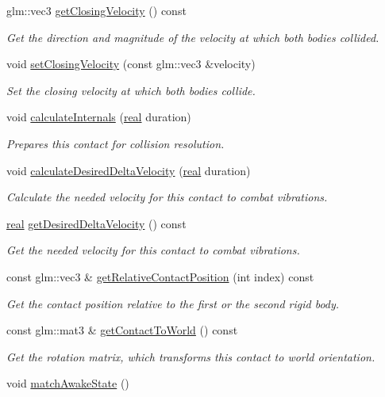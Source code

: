 \begin{DoxyCompactItemize}
glm\+::vec3 \mbox{\hyperlink{classr3_1_1_contact_a4c02edbc7514fbc84cd1b7d70797619c}{get\+Closing\+Velocity}} () const
\begin{DoxyCompactList}\small\item\em Get the direction and magnitude of the velocity at which both bodies collided. \end{DoxyCompactList}\item 
void \mbox{\hyperlink{classr3_1_1_contact_a7b837cd82d64d93ce1a98cdd172dd868}{set\+Closing\+Velocity}} (const glm\+::vec3 \&velocity)
\begin{DoxyCompactList}\small\item\em Set the closing velocity at which both bodies collide. \end{DoxyCompactList}\item 
void \mbox{\hyperlink{classr3_1_1_contact_a4e00a32cb21ff4fc8ec826f163bcddae}{calculate\+Internals}} (\mbox{\hyperlink{namespacer3_ab2016b3e3f743fb735afce242f0dc1eb}{real}} duration)
\begin{DoxyCompactList}\small\item\em Prepares this contact for collision resolution. \end{DoxyCompactList}\item 
void \mbox{\hyperlink{classr3_1_1_contact_a3f2c146006389bf6273cdd078763b7a3}{calculate\+Desired\+Delta\+Velocity}} (\mbox{\hyperlink{namespacer3_ab2016b3e3f743fb735afce242f0dc1eb}{real}} duration)
\begin{DoxyCompactList}\small\item\em Calculate the needed velocity for this contact to combat vibrations. \end{DoxyCompactList}\item 
\mbox{\hyperlink{namespacer3_ab2016b3e3f743fb735afce242f0dc1eb}{real}} \mbox{\hyperlink{classr3_1_1_contact_aff234679aa4302b69b8dd101eb969705}{get\+Desired\+Delta\+Velocity}} () const
\begin{DoxyCompactList}\small\item\em Get the needed velocity for this contact to combat vibrations. \end{DoxyCompactList}\item 
const glm\+::vec3 \& \mbox{\hyperlink{classr3_1_1_contact_ade5794f7055fb30ff52f9193b92c6bf0}{get\+Relative\+Contact\+Position}} (int index) const
\begin{DoxyCompactList}\small\item\em Get the contact position relative to the first or the second rigid body. \end{DoxyCompactList}\item 
const glm\+::mat3 \& \mbox{\hyperlink{classr3_1_1_contact_a4e9692d870bdba44ff6b627b8c6c6e30}{get\+Contact\+To\+World}} () const
\begin{DoxyCompactList}\small\item\em Get the rotation matrix, which transforms this contact to world orientation. \end{DoxyCompactList}\item 
void \mbox{\hyperlink{classr3_1_1_contact_a02d78ecc5afe6e7402dd11c655234e4a}{match\+Awake\+State}} ()
\end{DoxyCompactItemize}


